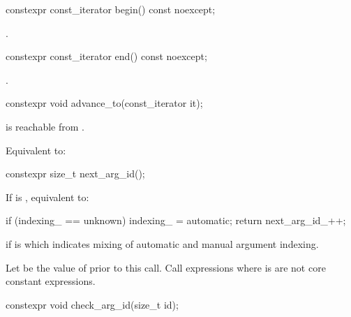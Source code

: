 %
\begin{itemdecl}
constexpr const_iterator begin() const noexcept;
\end{itemdecl}

\begin{itemdescr}
\pnum
\returns
{}.
\end{itemdescr}

%
\begin{itemdecl}
constexpr const_iterator end() const noexcept;
\end{itemdecl}

\begin{itemdescr}
\pnum
\returns
{}.
\end{itemdescr}

%
\begin{itemdecl}
constexpr void advance_to(const_iterator it);
\end{itemdecl}

\begin{itemdescr}
\pnum
\expects
{} is reachable from .

\pnum
\effects
Equivalent to: 
\end{itemdescr}

%
\begin{itemdecl}
constexpr size_t next_arg_id();
\end{itemdecl}

\begin{itemdescr}
\pnum
\effects
If  is , equivalent to:
\begin{codeblock}
if (indexing_ == unknown)
  indexing_ = automatic;
return next_arg_id_++;
\end{codeblock}

\pnum
\throws
{} if  is 
which indicates mixing of automatic and manual argument indexing.

\pnum
\remarks
Let  be the value of  prior to this call.
Call expressions where  is 
are not core constant expressions.
\end{itemdescr}

%
\begin{itemdecl}
constexpr void check_arg_id(size_t id);
\end{itemdecl}

